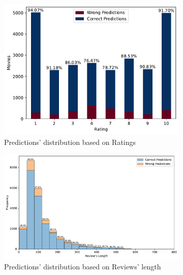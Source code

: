 \begin{figure}[h]
    \begin{subfigure}{0.5\textwidth}
      \centering
      \includegraphics[width=\linewidth]{figures/t_lr_ratings.pdf}
      \caption{Predictions' distribution based on Ratings}
      \label{fig:pred_distro_ratings}
    \end{subfigure}%
    \begin{subfigure}{0.5\textwidth}
      \centering
      \includegraphics[width=\linewidth]{figures/t_lr_lengths.pdf}
      \caption{Predictions' distribution based on Reviews' length}
      \label{fig:pred_distro_length}
    \end{subfigure}
    \caption{}
  
  \end{figure}



